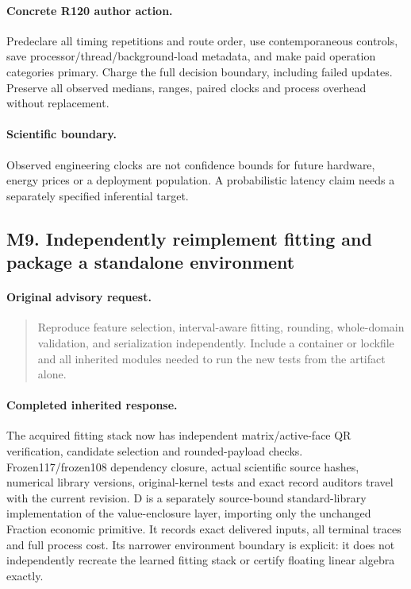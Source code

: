 \paragraph{Concrete R120 author action.}
Predeclare all timing repetitions and route order, use contemporaneous controls, save processor/thread/background-load metadata, and make paid operation categories primary. Charge the full decision boundary, including failed updates. Preserve all observed medians, ranges, paired clocks and process overhead without replacement.
\paragraph{Scientific boundary.}
Observed engineering clocks are not confidence bounds for future hardware, energy prices or a deployment population. A probabilistic latency claim needs a separately specified inferential target.

\subsection{M9. Independently reimplement fitting and package a standalone environment}
\label{response120:M9}
\paragraph{Original advisory request.}
\begin{quote}
Reproduce feature selection, interval-aware fitting, rounding, whole-domain validation, and serialization independently. Include a container or lockfile and all inherited modules needed to run the new tests from the artifact alone.
\end{quote}
\paragraph{Completed inherited response.}
The acquired fitting stack now has independent matrix/active-face QR verification, candidate selection and rounded-payload checks. Frozen117/frozen108 dependency closure, actual scientific source hashes, numerical library versions, original-kernel tests and exact record auditors travel with the current revision. D is a separately source-bound standard-library implementation of the value-enclosure layer, importing only the unchanged Fraction economic primitive. It records exact delivered inputs, all terminal traces and full process cost. Its narrower environment boundary is explicit: it does not independently recreate the learned fitting stack or certify floating linear algebra exactly.
